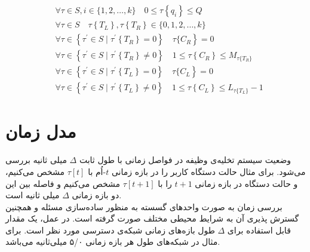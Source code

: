 \begin{equation}
	\label{eq:state-space}
	\begin{aligned}
		&\forall \tau \in S, i \in \{1,2, \ldots, k\} \quad 0 \leqslant\tau\left\{q_{i}\right\} \leqslant Q\\
		&\forall \tau \in S \quad  \tau\left\{T_L\right\},  \tau\left\{T_R\right\} \in \{0, 1,2, \ldots, k\}\\
		&\left.\forall \tau \in\left\{\tau^{\prime} \in S \mid \tau^{\prime}\left\{T_{R}\right\}=0\right\} \quad \tau\{C_R\right\}=0\\
		&\forall \tau \in\left\{\tau^{\prime} \in S \mid \tau^{\prime}\left\{T_{R}\right\} \neq 0\right\} \quad 1 \leqslant \tau\left\{C_{R}\right\} \leqslant M_{\tau\{T_{R}\}} \\
		&\left.\forall \tau \in\left\{\tau^{\prime} \in S \mid \tau^{\prime}\left\{T_{L}\right\}=0\right\} \quad \tau\{C_L\right\}=0\\
		&\forall \tau \in\left\{\tau^{\prime} \in S \mid \tau^{\prime}\left\{T_{L}\right\} \neq 0\right\} \quad 1 \leqslant \tau\left\{C_{L}\right\} \leqslant L_{\tau\{T_{L}\}} - 1
	\end{aligned}
\end{equation}

\newpage
\section{مدل زمان}
وضعیت سیستم تخلیه‌ی وظیفه در فواصل زمانی با طول ثابت \(\Delta\) میلی ثانیه بررسی می‌شود. برای مثال حالت دستگاه کاربر را در بازه زمانی \(t\)-اُم با \(\tau[t]\) مشخص می‌کنیم، و حالت دستگاه در بازه زمانی \(t + 1\) را با \(\tau[t + 1]\) مشخص می‌کنیم و فاصله بین این دو بازه زمانی \(\Delta\) میلی ثانیه است. \\

بررسی زمان به صورت واحدهای گسسته به منظور ساده‌سازی مسئله و همچنین گسترش پذیری آن به شرایط محیطی مختلف صورت گرفته است. در عمل، یک مقدار قابل استفاده برای \(\Delta\) طول بازه‌های زمانی شبکه‌ی دسترسی مورد نظر است. برای مثال در شبکه‌های  طول هر بازه زمانی ۵/۰ میلی‌ثانیه می‌باشد. \cite{LTE}

